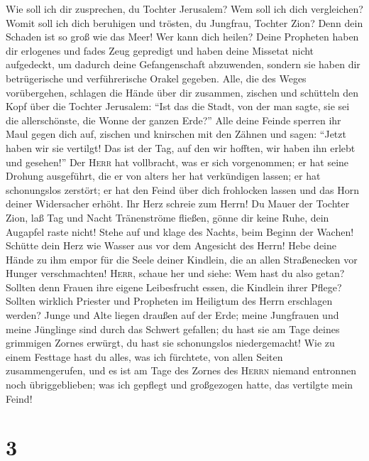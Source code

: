  Wie soll ich dir zusprechen, du Tochter Jerusalem? Wem
soll ich dich vergleichen? Womit soll ich dich beruhigen und trösten, du
Jungfrau, Tochter Zion? Denn dein Schaden ist so groß wie das Meer! Wer
kann dich heilen?  Deine Propheten haben dir erlogenes
und fades Zeug gepredigt und haben deine Missetat nicht aufgedeckt, um
dadurch deine Gefangenschaft abzuwenden, sondern sie haben dir
betrügerische und verführerische Orakel gegeben.  Alle,
die des Weges vorübergehen, schlagen die Hände über dir zusammen,
zischen und schütteln den Kopf über die Tochter Jerusalem: ``Ist das die
Stadt, von der man sagte, sie sei die allerschönste, die Wonne der
ganzen Erde?''  Alle deine Feinde sperren ihr Maul gegen
dich auf, zischen und knirschen mit den Zähnen und sagen: ``Jetzt haben
wir sie vertilgt! Das ist der Tag, auf den wir hofften, wir haben ihn
erlebt und gesehen!''  Der \textsc{Herr} hat vollbracht,
was er sich vorgenommen; er hat seine Drohung ausgeführt, die er von
alters her hat verkündigen lassen; er hat schonungslos zerstört; er hat
den Feind über dich frohlocken lassen und das Horn deiner Widersacher
erhöht.  Ihr Herz schreie zum Herrn! Du Mauer der Tochter
Zion, laß Tag und Nacht Tränenströme fließen, gönne dir keine Ruhe, dein
Augapfel raste nicht!  Stehe auf und klage des Nachts,
beim Beginn der Wachen! Schütte dein Herz wie Wasser aus vor dem
Angesicht des Herrn! Hebe deine Hände zu ihm empor für die Seele deiner
Kindlein, die an allen Straßenecken vor Hunger verschmachten!
 \textsc{Herr}, schaue her und siehe: Wem hast du also
getan? Sollten denn Frauen ihre eigene Leibesfrucht essen, die Kindlein
ihrer Pflege? Sollten wirklich Priester und Propheten im Heiligtum des
Herrn erschlagen werden?  Junge und Alte liegen draußen
auf der Erde; meine Jungfrauen und meine Jünglinge sind durch das
Schwert gefallen; du hast sie am Tage deines grimmigen Zornes erwürgt,
du hast sie schonungslos niedergemacht!  Wie zu einem
Festtage hast du alles, was ich fürchtete, von allen Seiten
zusammengerufen, und es ist am Tage des Zornes des \textsc{Herrn}
niemand entronnen noch übriggeblieben; was ich gepflegt und großgezogen
hatte, das vertilgte mein Feind!

\hypertarget{section-2}{%
\section{3}\label{section-2}}

